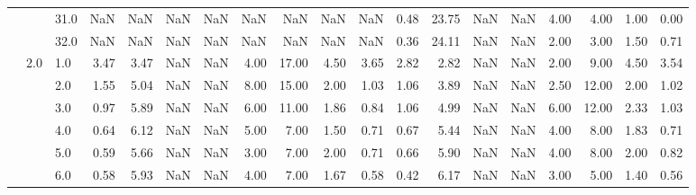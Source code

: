\begin{tabular}{lllrrrrrrrrrrrrrrrr}
      &     & 31.0 &       NaN &        NaN &               NaN &                NaN &  NaN &    NaN &              NaN &                          NaN &      0.48 &      23.75 &               NaN &                NaN & 4.00 &   4.00 &             1.00 &                         0.00 \\
      &     & 32.0 &       NaN &        NaN &               NaN &                NaN &  NaN &    NaN &              NaN &                          NaN &      0.36 &      24.11 &               NaN &                NaN & 2.00 &   3.00 &             1.50 &                         0.71 \\
      & 2.0 & 1.0  &      3.47 &       3.47 &               NaN &                NaN & 4.00 &  17.00 &             4.50 &                         3.65 &      2.82 &       2.82 &               NaN &                NaN & 2.00 &   9.00 &             4.50 &                         3.54 \\
      &     & 2.0  &      1.55 &       5.04 &               NaN &                NaN & 8.00 &  15.00 &             2.00 &                         1.03 &      1.06 &       3.89 &               NaN &                NaN & 2.50 &  12.00 &             2.00 &                         1.02 \\
      &     & 3.0  &      0.97 &       5.89 &               NaN &                NaN & 6.00 &  11.00 &             1.86 &                         0.84 &      1.06 &       4.99 &               NaN &                NaN & 6.00 &  12.00 &             2.33 &                         1.03 \\
      &     & 4.0  &      0.64 &       6.12 &               NaN &                NaN & 5.00 &   7.00 &             1.50 &                         0.71 &      0.67 &       5.44 &               NaN &                NaN & 4.00 &   8.00 &             1.83 &                         0.71 \\
      &     & 5.0  &      0.59 &       5.66 &               NaN &                NaN & 3.00 &   7.00 &             2.00 &                         0.71 &      0.66 &       5.90 &               NaN &                NaN & 4.00 &   8.00 &             2.00 &                         0.82 \\
      &     & 6.0  &      0.58 &       5.93 &               NaN &                NaN & 4.00 &   7.00 &             1.67 &                         0.58 &      0.42 &       6.17 &               NaN &                NaN & 3.00 &   5.00 &             1.40 &                         0.56 \\

\end{tabular}
